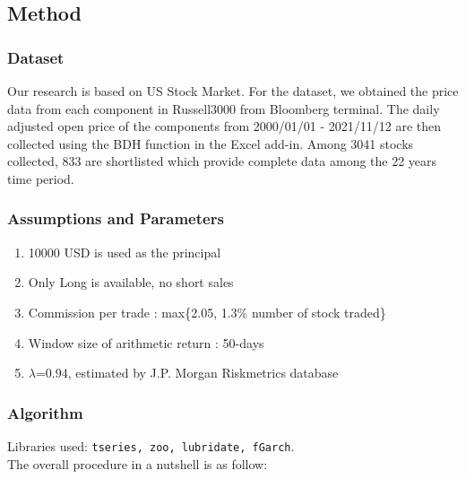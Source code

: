 \documentclass[11pt,a4paper]{article}
\begin{document}
    
    \subsection{Method}
    \subsubsection{Dataset}
    Our research is based on US Stock Market. For the dataset, we obtained the price data from each component in Russell3000 from Bloomberg terminal. The daily adjusted open price of the components from 2000/01/01 - 2021/11/12 are then collected using the BDH function in the Excel add-in. Among 3041 stocks collected, 833 are shortlisted which provide complete data among the 22 years time period.
    
    
    \subsubsection{Assumptions and Parameters}
    \begin{enumerate}
        \item 10000 USD is used as the principal
        \item Only Long is available, no short sales
        \item Commission per trade : max\{2.05, 1.3\% \texttimes{} number of stock traded\}
        \item Window size of arithmetic return : 50-days
        \item \(\lambda\)=0.94, estimated by J.P. Morgan Riskmetrics database\cite{JPM}
    \end{enumerate}
    
    \subsubsection{Algorithm}
    Libraries used: \texttt{tseries, zoo, lubridate, fGarch}. \\
    
    \noindent
    The overall procedure in a nutshell is as follow:
\end{document}
